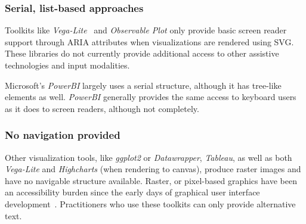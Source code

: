 \documentclass[12pt]{cmuthesis}
\newcommand{\ea}{{et~al\xperiod}\xspace}
\begin{document}
\subsubsection{Serial, list-based approaches}
Toolkits like \textit{Vega-Lite}~\cite{Satyanarayan2017VegaLite} and \textit{Observable Plot} only provide basic screen reader support through ARIA attributes when visualizations are rendered using SVG. These libraries do not currently provide additional access to other assistive technologies and input modalities.

Microsoft's \textit{PowerBI} largely uses a serial structure, although it has tree-like elements as well. \textit{PowerBI} generally provides the same access to keyboard users as it does to screen readers, although not completely.

\subsubsection{No navigation provided}
Other visualization tools, like \textit{ggplot2} or \textit{Datawrapper}, \textit{Tableau}, as well as both \textit{Vega-Lite} and \textit{Highcharts} (when rendering to canvas), produce raster images and have no navigable structure available. Raster, or pixel-based graphics have been an accessibility burden since the early days of graphical user interface development~\cite{Boyd1990Graphical}. Practitioners who use these toolkits can only provide alternative text.


\end{document}
